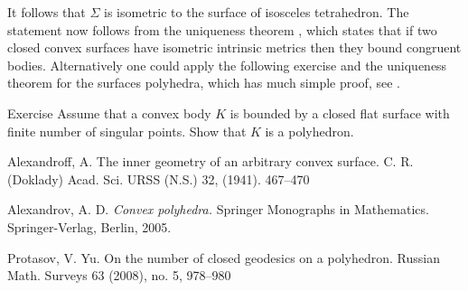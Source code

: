 \documentclass[oneside,a4paper, 12pt]{article}
\begin{document}
It follows that $\Sigma$ is isometric to the surface of isosceles tetrahedron.
The statement now follows from the uniqueness theorem \cite{???},
which states that if two closed convex surfaces have isometric intrinsic metrics then they bound congruent bodies.
Alternatively one could apply the following exercise and the uniqueness theorem for the surfaces polyhedra, which has much simple proof, see \cite{alexandrov1950}.
\qeds

\begin{thm}{Exercise}
Assume that a convex body $K$ is bounded by a closed flat surface with finite number of singular points.
Show that $K$ is a polyhedron.
\end{thm}

\begin{thebibliography}{52}
Alexandroff, A. 
The inner geometry of an arbitrary convex surface. C. R. (Doklady) 
Acad. Sci. URSS (N.S.) 
32, 
(1941). 
467--470

Alexandrov, A. D.
\emph{Convex polyhedra.}
Springer Monographs in Mathematics. Springer-Verlag, Berlin, 2005.

 Protasov, V. Yu. 
On the number of closed geodesics on a polyhedron.  Russian Math. Surveys 63 (2008), no. 5, 978--980
\end{thebibliography}
\end{document}
